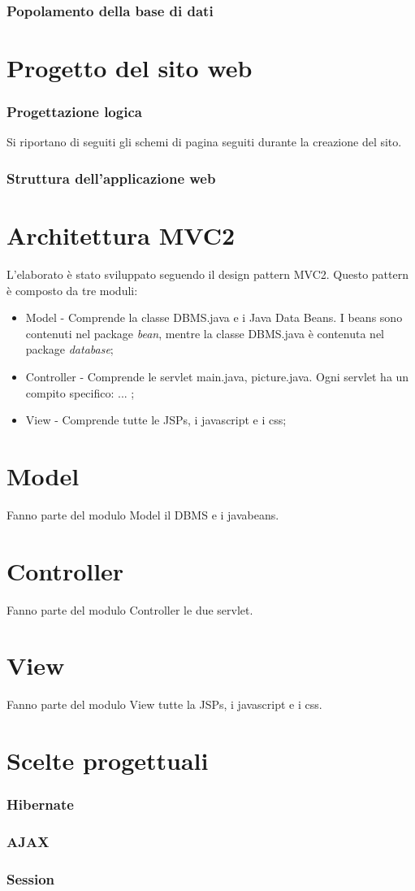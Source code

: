 \documentclass[a4paper,10pt]{report}
\begin{document}
\section{Popolamento della base di dati}



\part{Progetto del sito web}

\section{Progettazione logica}

Si riportano di seguiti gli schemi di pagina seguiti durante la creazione del sito.

\section{Struttura dell'applicazione web}

\part{Architettura MVC2}
L'elaborato \`e stato sviluppato seguendo il design pattern MVC2. Questo pattern \`e composto da tre moduli:

\begin{itemize}
 \item Model - Comprende la classe DBMS.java e i Java Data Beans. I beans sono contenuti nel package \textit{bean}, mentre la classe DBMS.java \`e contenuta nel package \textit{database};
 \item Controller - Comprende le servlet main.java, picture.java.  Ogni servlet ha un compito specifico: ... ;
 \item View - Comprende tutte le JSPs, i javascript e i css;
\end{itemize}

\part{Model}
Fanno parte del modulo Model il DBMS e i javabeans.
\part{Controller}
Fanno parte del modulo Controller le due servlet.
\part{View}
Fanno parte del modulo View tutte la JSPs, i javascript e i css.


\part{Scelte progettuali}

\section{Hibernate}
\section{AJAX}
\section{Session}
\end{document}
